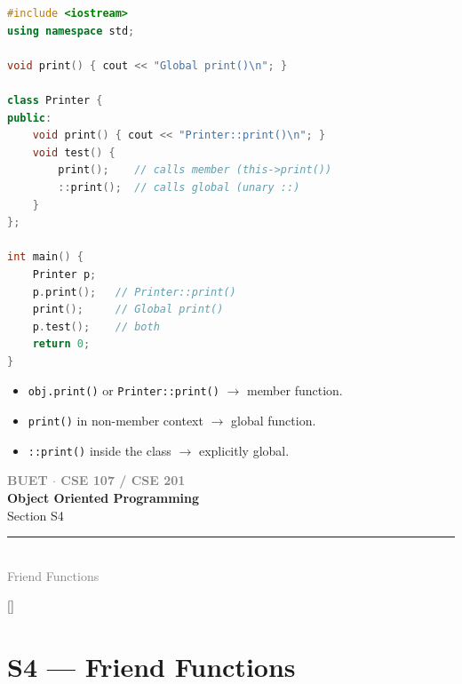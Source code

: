 \documentclass[12pt,a3paper]{article}
\newcommand{\secdivider}[4]{%
  \newpage\thispagestyle{empty}%
  \vspace*{\fill}%
  \begin{tcolorbox}[enhanced,colback=#4!7,colframe=#3,boxrule=1.5pt,arc=8pt,
    left=20pt,right=20pt,top=22pt,bottom=22pt,
    shadow={3pt}{-3pt}{0pt}{black!15}]
    \centering
    {\large\textcolor{gray}{\textbf{BUET $\cdot$ CSE 107 / CSE 201}}}\\[8pt]
    {\fontsize{26}{32}\selectfont\bfseries\textcolor{#3}{Object Oriented Programming}}\\[6pt]
    {\fontsize{15}{19}\selectfont\textcolor{dgray}{#1}}\\[12pt]
    \textcolor{#3!60}{\rule{0.5\textwidth}{0.5pt}}\\[6pt]
    {\small\textcolor{gray}{#2}}
  \end{tcolorbox}%
  \vspace*{\fill}\newpage%
}
\begin{document}
\begin{enumerate}
\begin{tcolorbox}
\begin{lstlisting}[language=C++]
#include <iostream>
using namespace std;

void print() { cout << "Global print()\n"; }

class Printer {
public:
    void print() { cout << "Printer::print()\n"; }
    void test() {
        print();    // calls member (this->print())
        ::print();  // calls global (unary ::)
    }
};

int main() {
    Printer p;
    p.print();   // Printer::print()
    print();     // Global print()
    p.test();    // both
    return 0;
}
\end{lstlisting}

\begin{itemize}[itemsep=2pt]
  \item \texttt{obj.print()} or \texttt{Printer::print()} $\to$
    member function.
  \item \texttt{print()} in non-member context $\to$ global function.
  \item \texttt{::print()} inside the class $\to$ explicitly global.
\end{itemize}

\end{tcolorbox}


\end{enumerate}
\newpage

\secdivider{Section S4}{Friend Functions }{cD}{cD}
\label{sec:S4}
\titleformat{\section}{\large\bfseries\color{cD}}{}{0em}{}[\titlerule]
\section{S4 --- Friend Functions }
\end{document}
